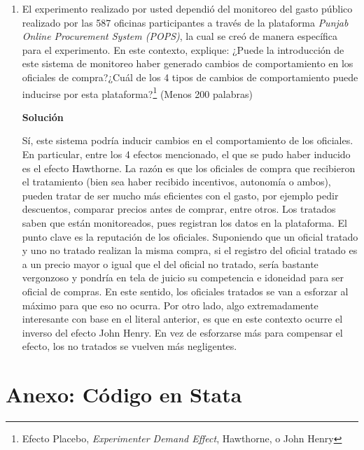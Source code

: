 \documentclass[a4paper, answers, addpoints, 11pt]{exam}
\newenvironment{solucion}{%
  \begin{mdframed}[
    backgroundcolor=blue!5,    %
    linecolor=blue!50,          %
    linewidth=2pt,              %
    leftmargin=10pt,            %
    rightmargin=8pt,           %
    topline=true,              %
    bottomline=true,            %
    roundcorner=10pt,           %
    innerleftmargin=10pt,       %
    innerrightmargin=10pt,      %
    innerbottommargin=10pt,     %
    innertopmargin=10pt         %
  ]%
  \begin{tcolorbox}[colframe=blue!50!black, colback=blue!50, coltitle=white, sharp corners=all, boxrule=1mm, width=\textwidth, halign=left, valign=center, top=0mm, bottom=0mm, left=0mm, right=0mm] \textbf{Solución} \end{tcolorbox} }{\end{mdframed}}
\begin{document}
\begin{enumerate}
    \item El experimento realizado por usted dependió del monitoreo del gasto público realizado por las 587 oficinas participantes a través de la plataforma \textit{Punjab Online Procurement System (POPS)}, la cual se creó de manera específica para el experimento. En este contexto, explique: ¿Puede la introducción de este sistema de monitoreo haber generado cambios de comportamiento en los oficiales de compra?¿Cuál de los 4 tipos de cambios de comportamiento puede inducirse por esta plataforma?\footnote{\footnotesize{Efecto Placebo, \textit{Experimenter Demand Effect}, Hawthorne, o John Henry}} (Menos 200 palabras)
     \begin{solucion}
     Sí, este sistema podría inducir cambios en el comportamiento de los oficiales. En particular, entre los 4 efectos mencionado, el que se pudo haber inducido es el efecto Hawthorne. La razón es que los oficiales de compra que recibieron el tratamiento (bien sea haber recibido incentivos, autonomía o ambos), pueden tratar de ser mucho más eficientes con el gasto, por ejemplo pedir descuentos, comparar precios antes de comprar, entre otros. Los tratados saben que están monitoreados, pues registran los datos en la plataforma. El punto clave es la reputación de los oficiales. Suponiendo que un oficial tratado y uno no tratado realizan la misma compra, si el registro del oficial tratado es a un precio mayor o igual que el del oficial no tratado, sería bastante vergonzoso y pondría en tela de juicio su competencia e idoneidad para ser oficial de compras. En este sentido, los oficiales tratados se van a esforzar al máximo para que eso no ocurra.  Por otro lado, algo extremadamente interesante con base en el literal anterior, es que en este contexto ocurre el inverso del efecto John Henry. En vez de esforzarse más para compensar el efecto, los no tratados se vuelven más negligentes.
     
   \end{solucion}
\end{enumerate}


\section*{Anexo: Código en Stata}
\end{document}
